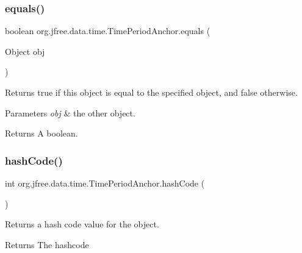 \subsubsection{\texorpdfstring{equals()}{equals()}}
{\footnotesize\ttfamily boolean org.\+jfree.\+data.\+time.\+Time\+Period\+Anchor.\+equals (\begin{DoxyParamCaption}\item[{Object}]{obj }\end{DoxyParamCaption})}

Returns {\ttfamily true} if this object is equal to the specified object, and {\ttfamily false} otherwise.


\begin{DoxyParams}{Parameters}
{\em obj} & the other object.\\
\hline
\end{DoxyParams}
\begin{DoxyReturn}{Returns}
A boolean. 
\end{DoxyReturn}
\mbox{\label{classorg_1_1jfree_1_1data_1_1time_1_1_time_period_anchor_ad0cd653c1193450a98df8e7d54d3d2a0}} 
\subsubsection{\texorpdfstring{hash\+Code()}{hashCode()}}
{\footnotesize\ttfamily int org.\+jfree.\+data.\+time.\+Time\+Period\+Anchor.\+hash\+Code (\begin{DoxyParamCaption}{ }\end{DoxyParamCaption})}

Returns a hash code value for the object.

\begin{DoxyReturn}{Returns}
The hashcode 
\end{DoxyReturn}
\mbox{\label{classorg_1_1jfree_1_1data_1_1time_1_1_time_period_anchor_a2185574b741ff96d150f37290a37e05b}} 
